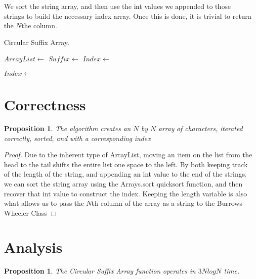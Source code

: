 \documentclass[12pt]{article}
\newtheorem{proposition}[theorem]{Proposition}
\begin{document}
We sort the string array, and then use the int values we appended to
those strings to build the necessary index array. Once this is
done, it is trivial to return the $N$the column.


\begin{algorithm}[H]
\caption{Circular Suffix Array.}
\begin{algorithmic}
        \State $ArrayList \gets$ 
        \State $Suffix \gets$ 
        		\State {}
            \State {}
        \EndFor
        \State $Index \gets$ 
        
            \State $Index \gets$ 
        \EndFor
    \EndProcedure
\end{algorithmic}
\end{algorithm}


\section{Correctness}

\begin{proposition}
The algorithm creates an $N$ by $N$ array of characters, iterated correctly, sorted, and with a corresponding index
\end{proposition}

\begin{proof}
Due to the inherent type of ArrayList, moving an item on the list from the head to the tail shifts the entire list one space to the left. By both keeping track of the length of the string, and appending an int value to the end of the strings, we can sort the string array using the Arrays.sort quicksort function, and then recover that int value to construct the index. Keeping the length variable is also what allows us to pass the $N$th column of the array as a string to the Burrows Wheeler Class
\end{proof}

\section{Analysis}

\begin{proposition}
\label{numq}
The Circular Suffix Array function operates in $3NlogN$ time.
\end{proposition}
\end{document}
